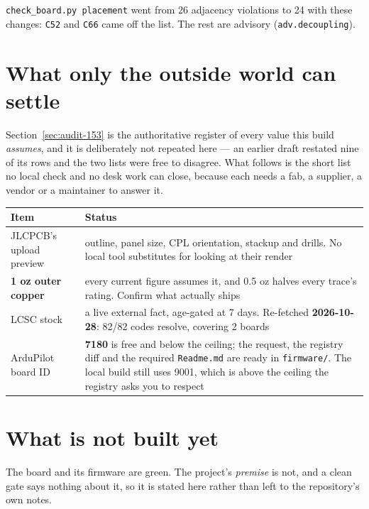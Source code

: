 \documentclass[11pt,a4paper]{article}
\newcommand{\file}[1]{\texttt{\small #1}}
\begin{document}
\file{check\_board.py placement} went from 26 adjacency violations to 24 with these changes:
\file{C52} and \file{C66} came off the list. The rest are advisory (\file{adv.decoupling}).

\section{What only the outside world can settle}

Section~\ref{sec:audit-153} is the authoritative register of every value this build
\emph{assumes}, and it is deliberately not repeated here --- an earlier draft restated nine of
its rows and the two lists were free to disagree. What follows is the short list no local
check and no desk work can close, because each needs a fab, a supplier, a vendor or a
maintainer to answer it.

\begin{center}
\begin{tabular}{@{}p{}p{}@{}}
\toprule
\textbf{Item} & \textbf{Status} \\
\midrule
JLCPCB's upload preview & outline, panel size, CPL orientation, stackup and drills. No local
tool substitutes for looking at their render \\
\textbf{1 oz outer copper} & every current figure assumes it, and 0.5 oz halves every trace's
rating. Confirm what actually ships \\
LCSC stock & a live external fact, age-gated at 7 days. Re-fetched \textbf{2026-10-28}:
82/82 codes resolve, covering 2 boards \\
ArduPilot board ID & \textbf{7180} is free and below the ceiling; the request, the registry
diff and the required \file{Readme.md} are ready in \file{firmware/}. The local build still
uses 9001, which is above the ceiling the registry asks you to respect \\
\bottomrule
\end{tabular}
\end{center}

\section{What is not built yet}

The board and its firmware are green. The project's \emph{premise} is not, and a clean gate
says nothing about it, so it is stated here rather than left to the repository's own notes.
\end{document}
